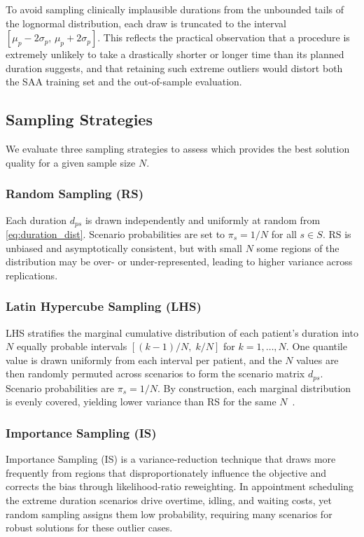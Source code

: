 To avoid sampling clinically implausible durations from the unbounded tails of
the lognormal distribution, each draw is truncated to the interval
$[\mu_p - 2\sigma_p,\, \mu_p + 2\sigma_p]$. This
reflects the practical observation that a procedure is extremely unlikely to
take a drastically shorter or longer time than its planned duration suggests,
and that retaining such extreme outliers would distort both the SAA training set
and the out-of-sample evaluation. 

\subsection{Sampling Strategies}
\label{sec:sampling}

We evaluate three sampling strategies to assess which provides the best
solution quality for a given sample size $N$.

\subsubsection{Random Sampling (RS)}
Each duration $d_{ps}$ is drawn independently and uniformly at random from
\eqref{eq:duration_dist}. Scenario probabilities are set to $\pi_s = 1/N$ for
all $s \in S$. RS is unbiased and asymptotically consistent, but with small
$N$ some regions of the distribution may be over- or under-represented, leading
to higher variance across replications.

\subsubsection{Latin Hypercube Sampling (LHS)}
LHS stratifies the marginal cumulative distribution of each patient's duration
into $N$ equally probable intervals $[(k-1)/N,\; k/N]$ for $k = 1, \dots, N$.
One quantile value is drawn uniformly from each interval per patient, and the
$N$ values are then randomly permuted across scenarios to form the scenario
matrix $d_{ps}$. Scenario probabilities are $\pi_s = 1/N$. By construction,
each marginal distribution is evenly covered, yielding lower variance than RS
for the same $N$~\cite{McKay1979}.

\subsubsection{Importance Sampling (IS)}

Importance Sampling (IS) is a variance-reduction technique that draws more
frequently from regions that disproportionately influence the objective and
corrects the bias through likelihood-ratio reweighting. In appointment
scheduling the extreme duration scenarios drive overtime, idling, and waiting costs, yet
random sampling assigns them low probability, requiring many scenarios for
robust solutions for these outlier cases.

